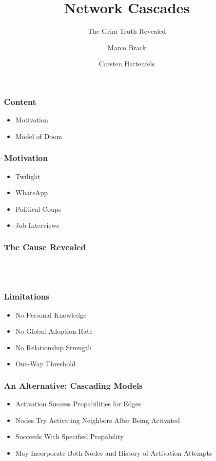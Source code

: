 \documentclass[slidestop,usenames,dvipsnames]{beamer}
\title{Network Cascades}
\subtitle{The Grim Truth Revealed}
\author{Marco Brack \and Carsten Hartenfels}
\newcommand{\fitem}{\pause\vfill\item}
\newcommand{\gitem}{\vfill\item}
\begin{document}
\begin{frame}
    \titlepage
\end{frame}




\begin{frame}
    \frametitle{Content}
    \begin{itemize}
        \gitem Motivation
        \gitem Model of Doom
    \end{itemize}
    \vfill
\end{frame}


\begin{frame}
    \frametitle{Motivation}
    \begin{itemize}
        \fitem Twilight
        \fitem WhatsApp
        \fitem Political Coups
        \fitem Job Interviews
    \end{itemize}
    \vfill
\end{frame}

\begin{frame}
    \frametitle{The Cause Revealed}
    \vfill
    \begin{center}
        \\
        \vspace{20pt}
        \\
        \vspace{20pt}
    \end{center}
    \vfill
\end{frame}



\begin{frame}
    \frametitle{Limitations}
    \begin{itemize}
        \fitem No Personal Knowledge
        \fitem No Global Adoption Rate
        \fitem No Relationship Strength
        \fitem One-Way Threshold
    \end{itemize}
    \vfill
\end{frame}

\begin{frame}
    \frametitle{An Alternative: Cascading Models}
    \begin{itemize}
        \fitem Activation Success Propabilities for Edges
        \fitem Nodes Try Activating Neighbors After Being Activated
        \fitem Succeeds With Specified Propability
        \fitem May Incorporate Both Nodes and History of Activation Attempts
    \end{itemize}
    \vfill
\end{frame}
\end{document}
